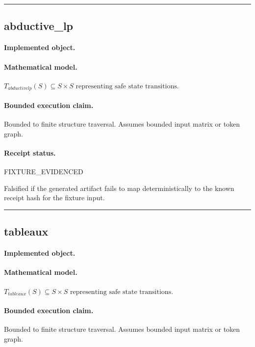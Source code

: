 \vspace{1em}\hrule\vspace{1em}
\subsection{abductive\_lp}
\paragraph{Implemented object.} 
\paragraph{Mathematical model.} $T_{abductivelp}(S) \subseteq S \times S \text{ representing safe state transitions}.$
\paragraph{Bounded execution claim.} Bounded to finite structure traversal. Assumes bounded input matrix or token graph.
\paragraph{Receipt status.} FIXTURE\_EVIDENCED
\begin{falsifier}
Falsified if the generated artifact fails to map deterministically to the known receipt hash for the fixture input.
\end{falsifier}

\vspace{1em}\hrule\vspace{1em}
\subsection{tableaux}
\paragraph{Implemented object.} 
\paragraph{Mathematical model.} $T_{tableaux}(S) \subseteq S \times S \text{ representing safe state transitions}.$
\paragraph{Bounded execution claim.} Bounded to finite structure traversal. Assumes bounded input matrix or token graph.
